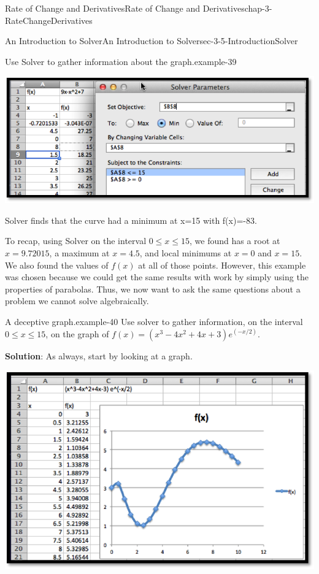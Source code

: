 \documentclass[oneside,10pt,]{book}
\newcommand{\terminology}[1]{\textbf{#1}}
\numberwithin{equation}{section}
\begin{document}
\begin{chapterptx}{Rate of Change and Derivatives}{}{Rate of Change and Derivatives}{}{}{chap-3-RateChangeDerivatives}
\begin{sectionptx}{An Introduction to Solver}{}{An Introduction to Solver}{}{}{sec-3-5-IntroductionSolver}
\begin{example}{Use Solver to gather information about the graph.}{example-39}
\begin{sidebyside}{1}{0.15}{0.15}{0}
\begin{sbspanel}{0.7}
\includegraphics[width=1\linewidth]{images/sec3-5-8.png}
\end{sbspanel}%
\end{sidebyside}%
\par
\hypertarget{p-1341}{}%
Solver finds that the curve had a minimum at x=15 with f(x)=-83.%
\end{example}
\hypertarget{p-1342}{}%
To recap, using Solver on the interval \(0\le x\le 15\), we found has a root at \(x=9.72015\), a maximum at \(x=4.5\), and local minimums at \(x=0\) and \(x=15\).  We also found the values of \(f(x)\) at all of those points.  However, this example was chosen because we could get the same results with work by simply using the properties of parabolas.  Thus, we now want to ask the same questions about a problem we cannot solve algebraically.%
\begin{example}{A deceptive graph.}{example-40}%
\hypertarget{p-1343}{}%
Use solver to gather information, on the interval \(0\le x\le 15\), on the graph of \(f(x)=(x^3-4x^2+4x+3) e^{(-x/2)}\).%
\par
\hypertarget{p-1344}{}%
\terminology{Solution}:  As always, start by looking at a graph.%
\begin{sidebyside}{1}{0.15}{0.15}{0}%
\begin{sbspanel}{0.7}%
\includegraphics[width=1\linewidth]{images/sec3-5-9.png}

\end{sbspanel}
\end{sidebyside}
\end{example}
\end{sectionptx}
\end{chapterptx}
\end{document}
